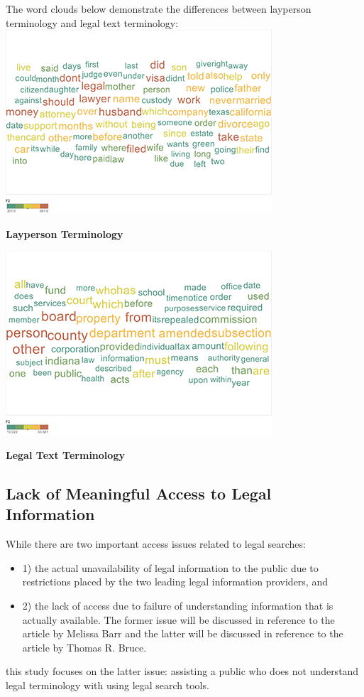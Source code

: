 \documentclass[11pt]{article}
\begin{document}
The word clouds below demonstrate the differences between layperson terminology and legal text terminology:
\includegraphics{UserWordCloud}

\textbf{Layperson Terminology}

\vspace{10mm}

\includegraphics{StatuteWordCloud}

\textbf{Legal Text Terminology}

\subsection{Lack of Meaningful Access to Legal Information}
While there are two important access issues related to legal searches:
\begin{itemize}
\item 1) the actual unavailability of legal information to the public due to restrictions placed by the two leading legal information providers, and 
\item 2) the lack of access due to failure of understanding information that is actually available.  The former issue will be discussed in reference to the article by Melissa Barr and the latter will be discussed in reference to the article by Thomas R. Bruce.
\end{itemize}
this study focuses on the latter issue: assisting a public who does not understand legal terminology with using legal search tools.  
  
\end{document}
